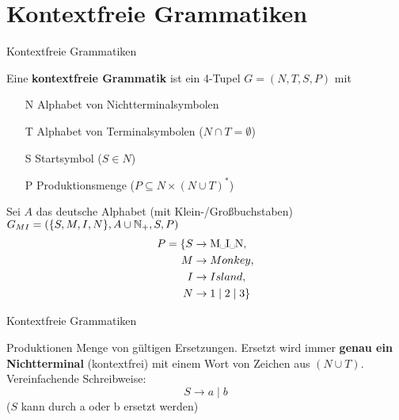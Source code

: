 \section{Kontextfreie Grammatiken}
\begin{frame}{Kontextfreie Grammatiken}
	
	\begin{Definition}
		Eine \textbf{kontextfreie Grammatik} ist ein 4-Tupel $G = (N, T, S ,P)$ mit
		\begin{itemize}
			\item[N] Alphabet von Nichtterminalsymbolen
			\item[T] Alphabet von Terminalsymbolen ($N \cap T = \emptyset$)
			\item[S] Startsymbol ($S \in N$)
			\item[P] Produktionsmenge ($P \subseteq N \times (N \cup T)^\ast$)
		\end{itemize}
	\end{Definition}

	\pause
	\begin{Beispiel}
		Sei $A$ das deutsche Alphabet (mit Klein-/Großbuchstaben)\\
		$G_{MI} = (\{S, M, I, N\}, A \cup \mathbb{N}_+, S, P)$
		\begin{align*}
			P = \{S &\to \text{M\textvisiblespace I\textvisiblespace N}, \\
			M &\to Monkey, \\
			I &\to Island, \\
			N &\to 1 \mid 2 \mid 3 \}
		\end{align*}
	\end{Beispiel}
\end{frame}

\begin{frame}{Kontextfreie Grammatiken}
	\begin{block}{Produktionen}
		Menge von gültigen Ersetzungen. Ersetzt wird immer \textbf{genau ein Nichtterminal} (kontextfrei) mit einem Wort von Zeichen aus $(N \cup T)$.\\
		\pause
		Vereinfachende Schreibweise: $$S \to a \mid b$$ ($S$ kann durch a oder b ersetzt werden)
	\end{block}
\end{frame}

